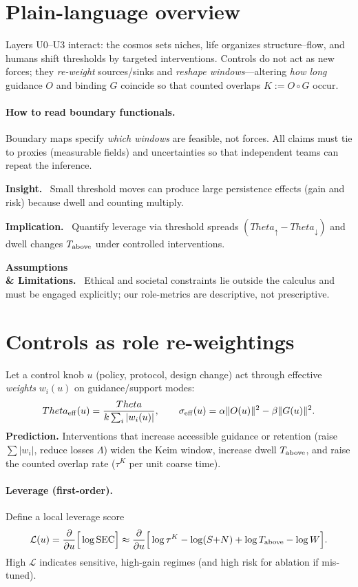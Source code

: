 \documentclass[12pt,a4paper,oneside]{scrreprt}
\def\Theta{Theta}%
\newenvironment{insight}{\par\vspace{0.5em}\noindent\textbf{Insight.}\ }{\par\vspace{0.5em}}
\newenvironment{implication}{\par\vspace{0.5em}\noindent\textbf{Implication.}\ }{\par\vspace{0.5em}}
\newenvironment{limitation}{\par\vspace{0.5em}\noindent\textbf{Assumptions \\ \& Limitations.}\ }{\par\vspace{0.5em}}
\begin{document}
\section*{Plain-language overview}
Layers U0–U3 interact: the cosmos sets niches, life organizes structure–flow, and humans shift thresholds by targeted interventions.
Controls do not act as new forces; they \emph{re-weight} sources/sinks and \emph{reshape windows}—altering \emph{how long} guidance $O$ and binding $G$ coincide so that counted overlaps $K:=O\!\circ G$ occur.

\paragraph{How to read boundary functionals.}
Boundary maps specify \emph{which windows} are feasible, not forces. All claims must tie to proxies (measurable fields) and uncertainties so that independent teams can repeat the inference.

\begin{insight}
Small threshold moves can produce large persistence effects (gain and risk) because dwell and counting multiply.
\end{insight}
\begin{implication}
Quantify leverage via threshold spreads $(\Theta_\uparrow-\Theta_\downarrow)$ and dwell changes $T_{\rm above}$ under controlled interventions.
\end{implication}
\begin{limitation}
Ethical and societal constraints lie outside the calculus and must be engaged explicitly; our role-metrics are descriptive, not prescriptive.
\end{limitation}

\section{Controls as role re-weightings}\label{sec:controls-mapping}
Let a control knob $u$ (policy, protocol, design change) act through effective \emph{weights} $w_i(u)$ on guidance/support modes:
\[
\Theta_{\rm eff}(u)=\frac{\Theta}{k\sum_i |w_i(u)|},\qquad 
\sigma_{\rm eff}(u)=\alpha\|O(u)\|^2-\beta\|G(u)\|^2.
\]
\textbf{Prediction.} Interventions that increase accessible guidance or retention (raise $\sum|w_i|$, reduce losses $\Lambda$) widen the Keim window, increase dwell $T_{\rm above}$, and raise the counted overlap rate ($\tau^K$ per unit coarse time).

\paragraph{Leverage (first-order).}
Define a local leverage score
\[
\mathcal L(u)=\frac{\partial}{\partial u}\Big[\log \mathrm{SEC}\Big]
\approx 
\frac{\partial}{\partial u}\Big[
\log \tau^K - \log(S{+}N) + \log T_{\rm above} - \log W
\Big].
\]
High $\mathcal L$ indicates sensitive, high-gain regimes (and high risk for ablation if mis-tuned).
\end{document}
